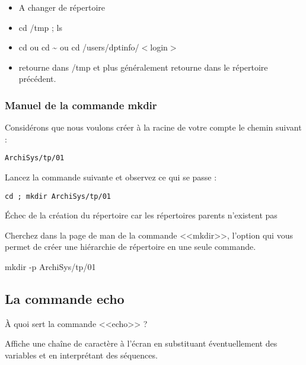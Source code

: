 \documentclass[11pt]{article}
\begin{document}
\begin{solution}
 \begin{itemize}
  \item A changer de répertoire
  \item cd /tmp ; ls
  \item cd ou cd \textasciitilde{} ou cd /users/dptinfo/$<$login$>$
  \item retourne dans /tmp et plus généralement retourne dans le répertoire précédent.
 \end{itemize}
\end{solution}

\subsubsection{Manuel de la commande \textbf{mkdir}}

Considérons que nous voulons créer à la racine de votre compte le chemin suivant :

\begin{lstlisting}
ArchiSys/tp/01
\end{lstlisting}

Lancez la commande suivante et observez ce qui se passe :

\begin{lstlisting}
cd ; mkdir ArchiSys/tp/01
\end{lstlisting}

\begin{solution}
Échec de la création du répertoire car les répertoires parents n'existent pas
\end{solution}

Cherchez dans la page de man de la commande <<mkdir>>, l’option qui vous permet de créer une hiérarchie de répertoire en une seule commande.

\begin{solution}
mkdir -p ArchiSys/tp/01
\end{solution}

\subsection{La commande echo}

À quoi sert la commande <<echo>> ?

\begin{solution}
Affiche une chaîne de caractère à l'écran en substituant éventuellement des variables et en interprétant des séquences.
\end{solution}
\end{document}
